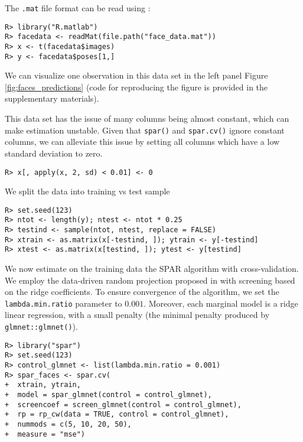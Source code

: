 \documentclass[
  article,
  nojss]{jss}
\begin{document}
The \texttt{.mat} file format can be read using 
\citep{pkg:rmatlab}:

\begin{verbatim}
R> library("R.matlab")
R> facedata <- readMat(file.path("face_data.mat"))
R> x <- t(facedata$images)
R> y <- facedata$poses[1,]
\end{verbatim}

We can visualize one observation in this data set in the left panel
Figure \ref{fig:faces_predictions} (code for reproducing the figure is
provided in the supplementary materials).

This data set has the issue of many columns being almost constant, which
can make estimation unstable. Given that \texttt{spar()} and
\texttt{spar.cv()} ignore constant columns, we can alleviate this issue
by setting all columns which have a low standard deviation to zero.

\begin{verbatim}
R> x[, apply(x, 2, sd) < 0.01] <- 0
\end{verbatim}

We split the data into training vs test sample

\begin{verbatim}
R> set.seed(123)
R> ntot <- length(y); ntest <- ntot * 0.25
R> testind <- sample(ntot, ntest, replace = FALSE)
R> xtrain <- as.matrix(x[-testind, ]); ytrain <- y[-testind]
R> xtest <- as.matrix(x[testind, ]); ytest <- y[testind]
\end{verbatim}

We now estimate on the training data the SPAR algorithm with
cross-validation. We employ the data-driven random projection proposed
in \citet{parzer2024sparse} with screening based on the ridge
coefficients. To ensure convergence of the  algorithm, we
set the \texttt{lambda.min.ratio} parameter to \(0.001\). Moreover, each
marginal model is a ridge linear regression, with a small penalty (the
minimal penalty produced by \texttt{glmnet::glmnet()}).

\begin{verbatim}
R> library("spar")
R> set.seed(123)
R> control_glmnet <- list(lambda.min.ratio = 0.001)
R> spar_faces <- spar.cv(
+  xtrain, ytrain,
+  model = spar_glmnet(control = control_glmnet),
+  screencoef = screen_glmnet(control = control_glmnet),
+  rp = rp_cw(data = TRUE, control = control_glmnet),
+  nummods = c(5, 10, 20, 50),
+  measure = "mse")
\end{verbatim}
\end{document}

